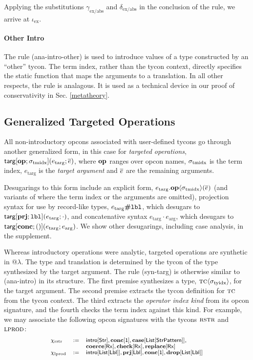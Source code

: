 \documentclass[10pt,preprint]{sigplanconf}
\begin{document}
Applying the substitutions $\gamma_\text{ex/abs}$ and $\delta_\text{ex/abs}$ in the conclusion of the rule, we arrive at $\iota_\text{ex}$.

\paragraph{Other Intro} The rule (ana-intro-other) is used to introduce values of a type constructed by an ``other'' tycon. The term index, rather than the tycon context, directly specifies the static function that maps the arguments to a translation. In all other respects, the rule is analagous. It is used as a technical device in our proof of conservativity in Sec. \ref{metatheory}.

\subsection{Generalized Targeted Operations} 
All non-introductory opcons associated with user-defined tycons go through another generalized form, in this case for \emph{targeted operations}, ${\sf targ}[\textbf{op}; \sigma_\text{tmidx}](e_\text{targ}; \overline{e})$, where $\textbf{op}$ ranges over opcon names, ${\sigma_\text{tmidx}}$ is the term index, $e_\text{targ}$ is the \emph{target argument} and $\overline{e}$ are the remaining arguments. 

Desugarings to this form include an explicit form, $e_\text{targ}.\textbf{op}\langle\sigma_\text{tmidx}\rangle(\overline{e})$ (and variants of where the term index or the arguments are omitted), projection syntax for use by record-like types, $e_\text{targ}\textbf{\#}\texttt{lbl}$, which desugars to ${\sf targ}[\textbf{prj}; \texttt{lbl}](e_\text{targ}; \cdot)$, and concatenative syntax $e_\text{targ} \cdot e_\text{arg}$, which desugars to ${\sf targ}[\textbf{conc}; ()](e_\text{targ}; e_\text{arg})$. We show other desugarings, including case analysis, in the supplement.


Whereas introductory operations were analytic, targeted operations are synthetic in @$\lambda$. The type and translation is determined by the tycon of the type synthesized by the target argument. The rule (syn-targ) is otherwise similar to (ana-intro) in its structure. The first premise synthesizes a type, ${\textsc{tc}}\langle\sigma_\text{tyidx}\rangle$, for the target argument. The second premise extracts the tycon definition for $\textsc{tc}$ from the tycon context. The third extracts the \emph{operator index kind} from its opcon signature, and the fourth checks the term index against this kind. For example, we may associate the following opcon signatures with the tycons $\textsc{rstr}$ and $\textsc{lprod}$:\[\small
\begin{array}{lcl}
\chi_\text{rstr} & := & \keyw{intro}[\keyw{Str}], \opsig{\opname{conc}}{\kunit}, \opsig{\opname{case}}{\klist{\keyw{StrPattern}}},  \\
& & \opsig{\opname{coerce}}{\krx}, \opsig{\opname{check}}{\krx}, \opsig{\opname{replace}}{\krx}\\
\chi_\text{lprod} & := & \keyw{intro}[\klist{\klbl}], \opsig{\opname{prj}}{\klbl}, \opsig{\opname{conc}}{\kunit}, \opsig{\opname{drop}}{\klist{\klbl}}
\end{array}
\]
\end{document}
